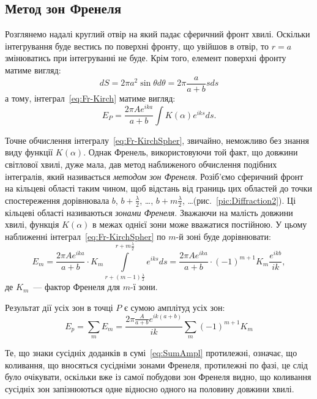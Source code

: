 \subsection*{Метод зон Френеля}


Розглянемо надалі круглий отвір на який падає сферичний фронт хвилі. Оскільки інтегрування буде вестись по поверхні фронту, що увійшов в отвір, то $r = a$ змінюватись при інтегруванні не буде. Крім того, елемент поверхні фронту матиме вигляд:
\[
dS = 2\pi a^2 \sin\theta d\theta = 2\pi \frac{a}{a + b} s ds
\]
а тому, інтеграл~\eqref{eq:Fr-Kirch} матиме вигляд:
\begin{equation}\label{eq:Fr-KirchSpher}
    E_P =  \frac{2\pi Ae^{ika}}{a + b} \int K(\alpha) e^{iks} ds.
\end{equation}

Точне обчислення інтегралу~\eqref{eq:Fr-KirchSpher}, звичайно, неможливо без знання виду функції $K(\alpha)$. Однак Френель, використовуючи той факт, що довжини світлової хвилі, дуже мала, дав метод наближеного обчислення подібних інтегралів, який називається \emph{методом зон Френеля}. Розіб'ємо сферичний фронт на кільцеві області таким чином, щоб відстань від границь цих областей до точки спостереження дорівнювала $b$, $b + \frac\lambda2$, \ldots,  $b + m\frac\lambda2$, \ldots  (рис.~\ref{pic:Diffraction2}). Ці кільцеві області називаються \emph{зонами Френеля}. Зважаючи на малість довжини хвилі, функція $K(\alpha)$ в межах однієї зони може вважатися постійною. У цьому наближенні інтеграл~\eqref{eq:Fr-KirchSpher} по $m$-й зоні буде дорівнювати:
\begin{equation}\label{eq:Fr-KirchSpher_m}
    E_m = \frac{2\pi Ae^{ika}}{a + b} \cdot K_m\int\limits_{r + (m-1)\frac\lambda2}^{r + m\frac\lambda2}   e^{iks} ds = \frac{2\pi Ae^{ika}}{a + b} \cdot (-1)^{m+1}K_m \frac{e^{ikb}}{ik},
\end{equation}
де $K_m$~--- фактор Френеля для $m$-ї зони.

Результат дії усіх зон в точці $P$ є сумою амплітуд усіх зон:
\begin{equation}\label{eq:SumAmpl}
    E_p = \sum\limits_{m} E_m =\frac{2\pi \frac{A}{a+b}e^{ik(a + b)}}{ik}  \sum\limits_{m} (-1)^{m+1}K_m
\end{equation}

Те, що знаки сусідніх  доданків в сумі~\eqref{eq:SumAmpl} протилежні, означає, що коливання, що вносяться сусідніми зонами Френеля, протилежні по фазі, це слід було очікувати, оскільки вже із самої побудови зон Френеля видно, що  коливання  сусідніх зон запізнюються одне відносно одного на половину довжини хвилі.

